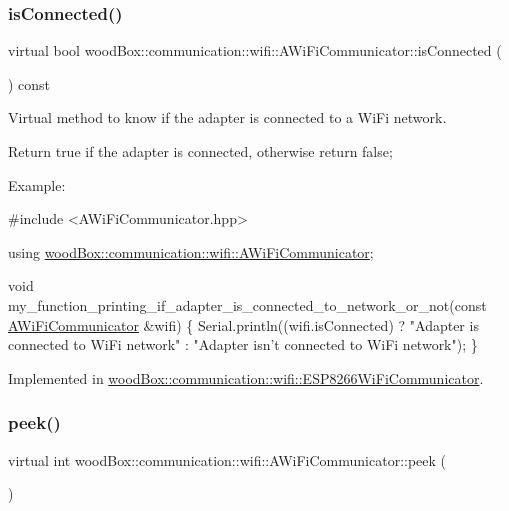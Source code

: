 \subsubsection{\texorpdfstring{is\+Connected()}{isConnected()}}
{\footnotesize\ttfamily virtual bool wood\+Box\+::communication\+::wifi\+::\+A\+Wi\+Fi\+Communicator\+::is\+Connected (\begin{DoxyParamCaption}{ }\end{DoxyParamCaption}) const\hspace{0.3cm}{\ttfamily [pure virtual]}}

Virtual method to know if the adapter is connected to a Wi\+Fi network.

Return true if the adapter is connected, otherwise return false;

Example\+:


\begin{DoxyCode}
\textcolor{preprocessor}{#include <AWiFiCommunicator.hpp>}

\textcolor{keyword}{using} \mbox{\hyperlink{classwood_box_1_1communication_1_1wifi_1_1_a_wi_fi_communicator}{woodBox::communication::wifi::AWiFiCommunicator}};

\textcolor{keywordtype}{void} my\_function\_printing\_if\_adapter\_is\_connected\_to\_network\_or\_not(\textcolor{keyword}{const} 
      \mbox{\hyperlink{classwood_box_1_1communication_1_1wifi_1_1_a_wi_fi_communicator_a9d1dc13ca9243170b04211bef2b86ed2}{AWiFiCommunicator}} &wifi) \{
  Serial.println((wifi.isConnected) ? \textcolor{stringliteral}{"Adapter is connected to WiFi network"} : \textcolor{stringliteral}{"Adapter isn't connected to
       WiFi network"});
\}
\end{DoxyCode}
 

Implemented in \mbox{\hyperlink{classwood_box_1_1communication_1_1wifi_1_1_e_s_p8266_wi_fi_communicator_a2a1d8b14bca4b6964f043b874d23090c}{wood\+Box\+::communication\+::wifi\+::\+E\+S\+P8266\+Wi\+Fi\+Communicator}}.

\mbox{\label{classwood_box_1_1communication_1_1wifi_1_1_a_wi_fi_communicator_ae0a1f2f1906f76a12dd5f9b7c10b1282}} 
\subsubsection{\texorpdfstring{peek()}{peek()}}
{\footnotesize\ttfamily virtual int wood\+Box\+::communication\+::wifi\+::\+A\+Wi\+Fi\+Communicator\+::peek (\begin{DoxyParamCaption}{ }\end{DoxyParamCaption})\hspace{0.3cm}{\ttfamily [pure virtual]}}

